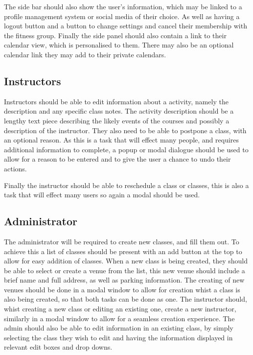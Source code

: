 \documentclass[10pt]{article}
\begin{document}
        The side bar should also show the user's information, which may be linked to a profile management system or social media of their choice. As well as having a logout button and a button to change settings and cancel their membership with the fitness group. Finally the side panel should also contain a link to their calendar view, which is personalised to them. There may also be an optional calendar link they may add to their private calendars.

      \subsection{Instructors}
        Instructors should be able to edit information about a activity, namely the description and any specific class notes. The activity description should be a lengthy text piece describing the likely events of the courses and possibly a description of the instructor. They also need to be able to postpone a class, with an optional reason. As this is a task that will effect many people, and requires additional information to complete, a popup or modal dialogue should be used to allow for a reason to be entered and to give the user a chance to undo their actions. 
        
        Finally the instructor should be able to reschedule a class or classes, this is also a task that will effect many users so again a modal should be used.

      \subsection{Administrator}
        The administrator will be required to create new classes, and fill them out. To achieve this a list of classes should be present with an add button at the top to allow for easy addition of classes. When a new class is being created, they should be able to select or create a venue from the list, this new venue should include a brief name and full address, as well as parking information. The creating of new venues should be done in a modal window to allow for creation whist a class is also being created, so that both tasks can be done as one. The instructor should, whist creating a new class or editing an existing one, create a new instructor, similarly in a modal window to allow for a seamless creation experience. The admin should also be able to edit information in an existing class, by simply selecting the class they wish to edit and having the information displayed in relevant edit boxes and drop downs. 
\end{document}
